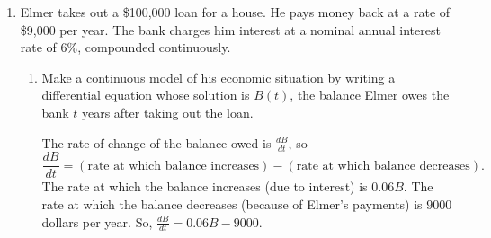 \documentclass{article}
\begin{document}
\begin{enumerate}
\begin{enumerate}
    \begin{solution}
      Newton's Law of Cooling says that $\frac{dP}{dt}$ is proportional to
      $P - 70$, so $\frac{dP}{dt} = k (P - 70)$.  (The constant $k$ should
      be negative because $\frac{dP}{dt}$ is negative and $P - 70$ is
      positive for our pizza.)

      We also have an initial condition, $P(0) = 190$. 
    \end{solution}

  \item
    \begin{problem}
      When the pizza is $190\,^\circ$F, it's cooling at an instantaneous rate
      of $20\,^\circ$F per minute.  Incorporate this information into your
      differential equation.
    \end{problem}
    \pspace{\vfill}

    \begin{solution}
      We are told that, when $P = 190$, $\frac{dP}{dt} = -20$.  Plugging
      this information into our differential equation, $-20 = k (190 -
      70)$, so $k = - \frac{1}{6}$.  Therefore, our differential equation
      becomes $\boxed{\frac{dP}{dt} = - \frac{1}{6} (P - 70)}$. 
    \end{solution}

  \end{enumerate}

  \pspace{\newpage}

\item 

  Elmer takes out a \$100,000 loan for a house. He pays
  money back at a rate of \$9,000 per year. The bank charges him interest
  at a nominal annual interest rate of 6\%, compounded continuously.

  \begin{enumerate}
  \item
    \begin{problem}
      Make a continuous model of his economic situation by writing a
      differential equation whose solution is $B(t)$, the balance Elmer
      owes the bank $t$ years after taking out the loan.
    \end{problem}


    \begin{solution} %
      The rate of change of the balance owed is $\frac{dB}{dt}$, so 
      \[ \frac{dB}{dt} = (\text{rate at which balance increases}) -
      (\text{rate at which balance decreases}).\] The rate at which the
      balance increases (due to interest) is $0.06B$.  The rate at which
      the balance decreases (because of Elmer's payments) is $9000$
      dollars per year.  So, $\boxed{\frac{dB}{dt} = 0.06B - 9000}$.


\end{solution}
\end{enumerate}
\end{enumerate}
\end{document}
